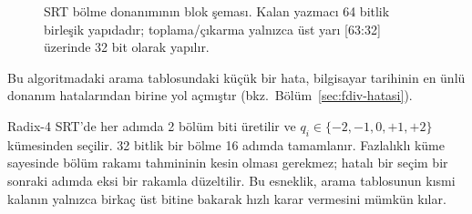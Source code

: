 \begin{figure}[htbp]
\caption[SRT b{\"o}lme donan{\i}m{\i}]{SRT bölme donanımının blok şeması. Kalan yazmacı 64 bitlik birleşik yapıdadır; toplama/çıkarma yalnızca üst yarı [63:32] üzerinde 32 bit olarak yapılır.}
\label{fig:srt-donanim}
\end{figure}

Bu algoritmadaki arama tablosundaki küçük bir hata, bilgisayar tarihinin en ünlü donanım hatalarından birine yol açmıştır (bkz.\ Bölüm~\ref{sec:fdiv-hatasi}).

Radix-4 SRT'de her adımda 2 bölüm biti üretilir ve $q_i \in \{-2, -1, 0, +1, +2\}$ kümesinden seçilir. 32 bitlik bir bölme 16 adımda tamamlanır. Fazlalıklı küme sayesinde bölüm rakamı tahmininin kesin olması gerekmez; hatalı bir seçim bir sonraki adımda eksi bir rakamla düzeltilir. Bu esneklik, arama tablosunun kısmi kalanın yalnızca birkaç üst bitine bakarak hızlı karar vermesini mümkün kılar.

